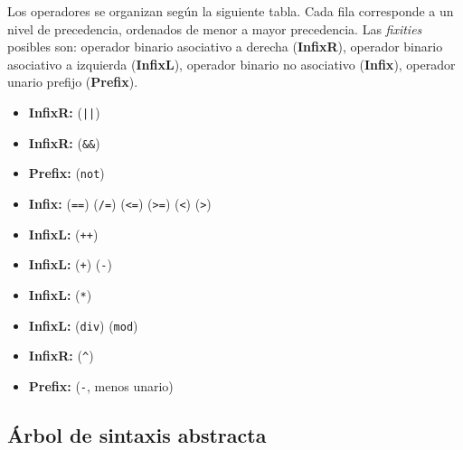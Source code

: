 \documentclass{article}
\begin{document}
Los operadores se organizan seg\'un la siguiente tabla.
Cada fila corresponde a un nivel de precedencia, ordenados de menor a mayor precedencia.
Las {\em fixities} posibles son:
operador binario asociativo a derecha ({\bf InfixR}),
operador binario asociativo a izquierda ({\bf InfixL}),
operador binario no asociativo ({\bf Infix}),
operador unario prefijo ({\bf Prefix}).

\begin{itemize}
\item {\bf InfixR:}  (\texttt{||})
\item {\bf InfixR:}  (\texttt{\&\&})
\item {\bf Prefix:}  (\texttt{not})
\item {\bf Infix:}
   (\texttt{==})
   (\texttt{/=})
   (\texttt{<=})
   (\texttt{>=})
   (\texttt{<})
   (\texttt{>})
\item {\bf InfixL:}
   (\texttt{++})
\item {\bf InfixL:}
   (\texttt{+})
   (\texttt{-})
\item {\bf InfixL:}
   (\texttt{*})
\item {\bf InfixL:}
   (\texttt{div})
   (\texttt{mod})
\item {\bf InfixR:}
   (\texttt{\^})
\item {\bf Prefix:}
   (\texttt{-}, menos unario)
\end{itemize}

\subsection{\'Arbol de sintaxis abstracta}
\end{document}
